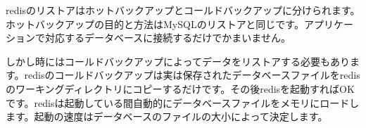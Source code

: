 redisのリストアはホットバックアップとコールドバックアップに分けられます。ホットバックアップの目的と方法はMySQLのリストアと同じです。アプリケーションで対応するデータベースに接続するだけでかまいません。

しかし時にはコールドバックアップによってデータをリストアする必要もあります。redisのコールドバックアップは実は保存されたデータベースファイルをredisのワーキングディレクトリにコピーするだけです。その後redisを起動すればOKです。redisは起動している間自動的にデータベースファイルをメモリにロードします。起動の速度はデータベースのファイルの大小によって決定します。
